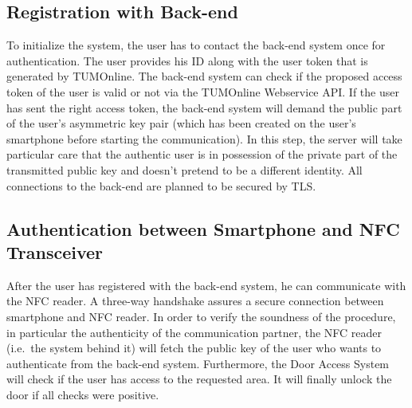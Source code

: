 \subsection{Registration with Back-end}
To initialize the system, the user has to contact the back-end system once for authentication.
The user provides his ID along with the user token that is generated by TUMOnline.
The back-end system can check if the proposed access token of the user is valid or not via the TUMOnline Webservice API.
If the user has sent the right access token, the back-end system will demand the public part of the user's asymmetric key pair (which has been created on the user's smartphone before starting the communication).
In this step, the server will take particular care that the authentic user is in possession of the private part of the transmitted public key and doesn't pretend to be a different identity.
All connections to the back-end are planned to be secured by TLS.


\subsection{Authentication between Smartphone and NFC Transceiver}
After the user has registered with the back-end system, he can communicate with the NFC reader. 
A three-way handshake assures a secure connection between smartphone and NFC reader.
In order to verify the soundness of the procedure, in particular the authenticity of the communication partner, the NFC reader (i.e.~the system behind it) will fetch the public key of the user who wants to authenticate from the back-end system.
Furthermore, the Door Access System will check if the user has access to the requested area.
It will finally unlock the door if all checks were positive.

